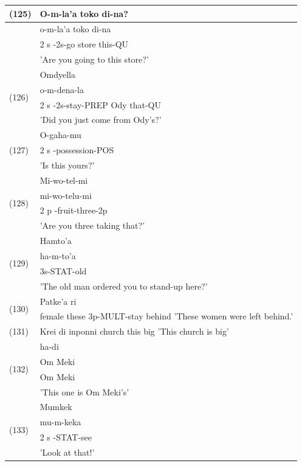 \documentclass[10pt]{article}
\begin{document}
\begin{center}
\begin{tabular}{|l|l|}
\hline
\multirow[t]{4}{*}{(125)} & O-m-la'a toko di-na? \\
\hline
 & o-m-la'a toko di-na \\
\hline
 & 2 s -2s-go store this-QU \\
\hline
 & 'Are you going to this store?' \\
\hline
\multirow[t]{4}{*}{(126)} & Omdyella \\
\hline
 & o-m-dena-la \\
\hline
 & 2 s -2s-stay-PREP Ody that-QU \\
\hline
 & 'Did you just come from Ody's?' \\
\hline
\multirow[t]{3}{*}{(127)} & O-gaha-mu \\
\hline
 & 2 s -possession-POS \\
\hline
 & 'Is this yours?' \\
\hline
\multirow[t]{4}{*}{(128)} & Mi-wo-tel-mi \\
\hline
 & mi-wo-telu-mi \\
\hline
 & 2 p -fruit-three-2p \\
\hline
 & 'Are you three taking that?' \\
\hline
\multirow[t]{4}{*}{(129)} & Hamto'a \\
\hline
 & ha-m-to'a \\
\hline
 & 3s-STAT-old \\
\hline
 & 'The old man ordered you to stand-up here?' \\
\hline
\multirow[t]{3}{*}{(130)} & Patke'a ri \\
\hline
 & \multirow{2}{*}{female these 3p-MULT-stay behind 'These women were left behind.'} \\
\hline
 &  \\
\hline
(131) & Krei di inponni church this big 'This church is big' \\
\hline
\multirow[t]{4}{*}{(132)} & ha-di \\
\hline
 & Om Meki \\
\hline
 & Om Meki \\
\hline
 & 'This one is Om Meki's' \\
\hline
\multirow[t]{4}{*}{(133)} & Mumkek \\
\hline
 & mu-m-keka \\
\hline
 & 2 s -STAT-see \\
\hline
 & 'Look at that!' \\
\hline
\end{tabular}
\end{center}
\end{document}
